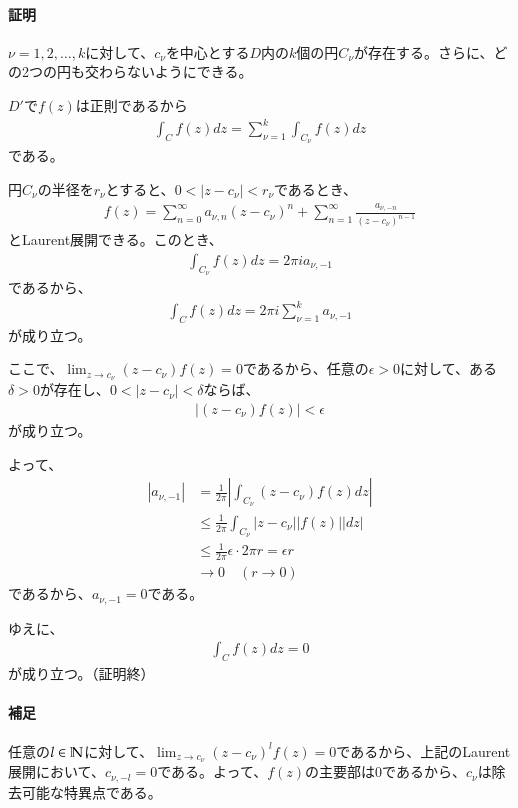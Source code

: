 \paragraph{証明}
$\nu=1,2,\dots,k$に対して、$c_\nu$を中心とする$D$内の$k$個の円$C_\nu$が存在する。さらに、どの2つの円も交わらないようにできる。

$D'$で$f(z)$は正則であるから
\begin{align*}
    \int_Cf(z)dz
    =\sum_{\nu=1}^{k}\int_{C_\nu}f(z)dz
\end{align*}
である。

円$C_\nu$の半径を$r_\nu$とすると、$0<|z-c_\nu|<r_\nu$であるとき、
\begin{align*}
    f(z)
    =\sum_{n=0}^{\infty}a_{\nu,n}(z-c_\nu)^n
    +\sum_{n=1}^{\infty}\frac{a_{\nu,-n}}{(z-c_\nu)^{n-1}}
\end{align*}
とLaurent展開できる。このとき、
\begin{align*}
    \int_{C_\nu}f(z)dz=2\pi i a_{\nu,-1}
\end{align*}
であるから、
\begin{align*}
    \int_Cf(z)dz
    =2\pi i \sum_{\nu=1}^{k}a_{\nu,-1}
\end{align*}
が成り立つ。

ここで、$\lim_{z\longrightarrow c_\nu}(z-c_\nu)f(z)=0$であるから、任意の$\epsilon>0$に対して、ある$\delta>0$が存在し、$0<|z-c_\nu|<\delta$ならば、
\begin{align*}
    |(z-c_\nu)f(z)|<\epsilon
\end{align*}
が成り立つ。

よって、
\begin{align*}
    |a_{\nu,-1}|
    &=\frac{1}{2\pi}\left| \int_{C_\nu}(z-c_\nu)f(z)dz\right|\\
    &\le \frac{1}{2\pi}\int_{C_\nu}|z-c_\nu|\left|f(z)\right||dz|\\
    &\le \frac{1}{2\pi}\epsilon\cdot2\pi r=\epsilon r\\
    &\longrightarrow 0\quad(r\longrightarrow0)
\end{align*}
であるから、$a_{\nu,-1}=0$である。

ゆえに、
\begin{align*}
    \int_Cf(z)dz=0
\end{align*}
が成り立つ。（証明終）

\paragraph{補足}
任意の$l\in\mathbb{N}$に対して、$\lim_{z\longrightarrow c_\nu}(z-c_\nu)^lf(z)=0$であるから、上記のLaurent展開において、$c_{\nu,-l}=0$である。よって、$f(z)$の主要部は0であるから、$c_\nu$は除去可能な特異点である。

